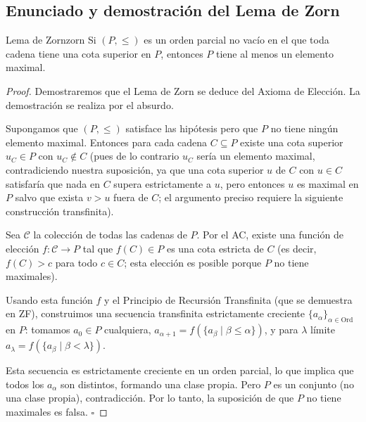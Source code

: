 \subsection{Enunciado y demostración del Lema de Zorn}

\begin{lema}{Lema de Zorn}{zorn}
Si $(P, \leq)$ es un orden parcial no vacío en el que toda cadena tiene una cota superior en $P$, entonces $P$ tiene al menos un elemento maximal.
\end{lema}

\begin{proof}
Demostraremos que el Lema de Zorn se deduce del Axioma de Elección. La demostración se realiza por el absurdo.

Supongamos que $(P, \leq)$ satisface las hipótesis pero que $P$ no tiene ningún elemento maximal. Entonces para cada cadena $C \subseteq P$ existe una cota superior $u_C \in P$ con $u_C \notin C$ (pues de lo contrario $u_C$ sería un elemento maximal, contradiciendo nuestra suposición, ya que una cota superior $u$ de $C$ con $u \in C$ satisfaría que nada en $C$ supera estrictamente a $u$, pero entonces $u$ es maximal en $P$ salvo que exista $v > u$ fuera de $C$; el argumento preciso requiere la siguiente construcción transfinita).

Sea $\mathcal{C}$ la colección de todas las cadenas de $P$. Por el AC, existe una función de elección $f: \mathcal{C} \to P$ tal que $f(C) \in P$ es una cota estricta de $C$ (es decir, $f(C) > c$ para todo $c \in C$; esta elección es posible porque $P$ no tiene maximales).

Usando esta función $f$ y el Principio de Recursión Transfinita (que se demuestra en ZF), construimos una secuencia transfinita estrictamente creciente $\{a_\alpha\}_{\alpha \in \mathrm{Ord}}$ en $P$: tomamos $a_0 \in P$ cualquiera, $a_{\alpha+1} = f(\{a_\beta \mid \beta \leq \alpha\})$, y para $\lambda$ límite $a_\lambda = f(\{a_\beta \mid \beta < \lambda\})$.

Esta secuencia es estrictamente creciente en un orden parcial, lo que implica que todos los $a_\alpha$ son distintos, formando una clase propia. Pero $P$ es un conjunto (no una clase propia), contradicción. Por lo tanto, la suposición de que $P$ no tiene maximales es falsa. $\square$
\end{proof}

